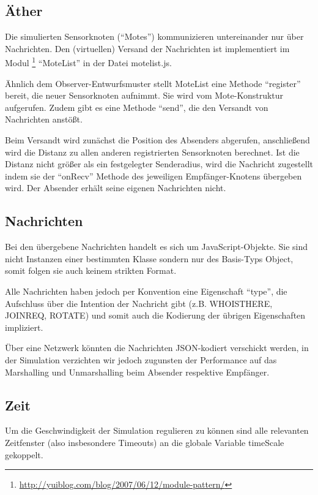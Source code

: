 \subsection{Äther}

Die simulierten Sensorknoten (``Motes'') kommunizieren untereinander nur über
Nachrichten. Den (virtuellen) Versand der Nachrichten ist implementiert im
Modul \footnote{\url{http://yuiblog.com/blog/2007/06/12/module-pattern/}}
``MoteList'' in der Datei motelist.js.

Ähnlich dem Observer-Entwurfsmuster stellt MoteList eine Methode
``register'' bereit, die neuer Sensorknoten aufnimmt. Sie wird vom
Mote-Konstruktur aufgerufen. Zudem gibt es eine Methode ``send'', die
den Versandt von Nachrichten anstößt.

Beim Versandt wird zunächst die Position des Absenders abgerufen,
anschließend wird die Distanz zu allen anderen registrierten
Sensorknoten berechnet. Ist die Distanz nicht größer als ein
festgelegter Senderadius, wird die Nachricht zugestellt indem sie der
``onRecv'' Methode des jeweiligen Empfänger-Knotens übergeben wird. Der
Absender erhält seine eigenen Nachrichten nicht.

\subsection{Nachrichten}

Bei den übergebene Nachrichten handelt es sich um JavaScript-Objekte.
Sie sind nicht Instanzen einer bestimmten Klasse sondern nur des
Basis-Typs Object, somit folgen sie auch keinem strikten Format.

Alle Nachrichten haben jedoch per Konvention eine Eigenschaft ``type'',
die Aufschluss über die Intention der Nachricht gibt (z.B. WHOISTHERE,
JOINREQ, ROTATE) und somit auch die Kodierung der übrigen Eigenschaften
impliziert.

Über eine Netzwerk könnten die Nachrichten JSON-kodiert verschickt
werden, in der Simulation verzichten wir jedoch zugunsten der
Performance auf das Marshalling und Unmarshalling beim Absender
respektive Empfänger.

\subsection{Zeit}

Um die Geschwindigkeit der Simulation regulieren zu können sind alle
relevanten Zeitfenster (also insbesondere Timeouts) an die globale
Variable timeScale gekoppelt.

